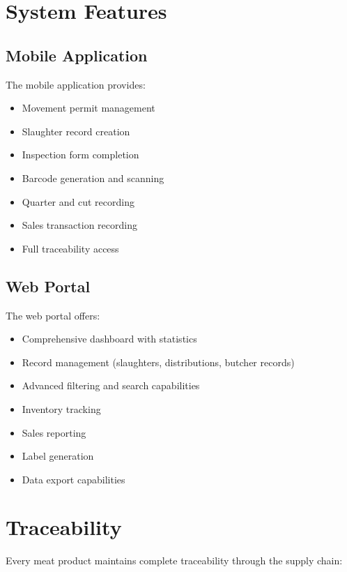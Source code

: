 \documentclass[11pt,a4paper]{article}
\begin{document}
\section{System Features}

\subsection{Mobile Application}

The mobile application provides:

\begin{itemize}[leftmargin=*]
    \item Movement permit management
    \item Slaughter record creation
    \item Inspection form completion
    \item Barcode generation and scanning
    \item Quarter and cut recording
    \item Sales transaction recording
    \item Full traceability access
\end{itemize}

\subsection{Web Portal}

The web portal offers:

\begin{itemize}[leftmargin=*]
    \item Comprehensive dashboard with statistics
    \item Record management (slaughters, distributions, butcher records)
    \item Advanced filtering and search capabilities
    \item Inventory tracking
    \item Sales reporting
    \item Label generation
    \item Data export capabilities
\end{itemize}

\section{Traceability}

Every meat product maintains complete traceability through the supply chain:
\end{document}
